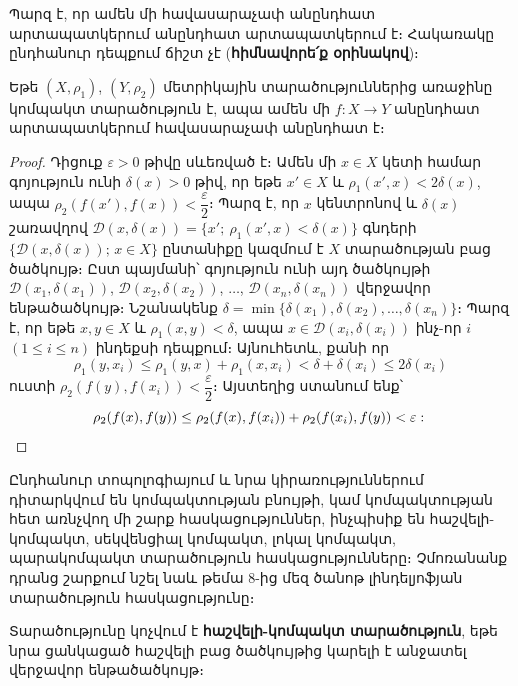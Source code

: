 \documentclass[./main.tex]{subfiles}
\begin{document}
\par Պարզ է, որ ամեն մի հավասարաչափ անընդհատ արտապատկերում անընդհատ արտապատկերում է։ Հակառակը ընդհանուր դեպքում ճիշտ չէ (\textbf{հիմնավորե՛ք օրի\-նա\-կով})։

\begin{theorem}\label{ch17thm10} \label{թեորեմ 10}
Եթե $(X, \rho_1)$, $(Y, \rho_2)$ մետրիկային տարածություններից առաջինը կոմ\-պակտ տարածություն է, ապա ամեն մի $f: X \to Y$ անընդհատ արտապատկե\-րում հավասարաչափ անընդհատ է։
\end{theorem} %

\begin{proof}
Դիցուք $\varepsilon > 0$ թիվը սևեռված է։ Ամեն մի $x \in X$ կետի համար գո\-յու\-թյուն ունի $\delta(x) > 0$ թիվ, որ եթե $x' \in X$ և $\rho_1(x', x) < 2\delta(x)$, ապա $\rho_2(f(x'), f(x)) < \dfrac{\varepsilon}{2}$։ Պարզ է, որ $x$ կենտրոնով և $\delta(x)$ շառավղով $\mathcal{D}(x, \delta(x)) = \{x';\  \rho_1(x', x) < \delta(x)\}$ գնդերի $\{\mathcal{D}(x, \delta(x));\, x \in X\}$ ընտանիքը կազմում է $X$ տարածության բաց ծածկույթ։ Ըստ պայմանի՝ գոյություն ունի այդ ծածկույթի $\mathcal{D}(x_1, \delta(x_1))$, $\mathcal{D}(x_2, \delta(x_2))$, $\dots$, \linebreak $\mathcal{D}(x_n, \delta(x_n))$ վերջավոր ենթածածկույթ։ Նշանակենք $\delta = \min\{\delta(x_1), \delta(x_2), \dots, \delta(x_n)\}$։ Պարզ է, որ եթե $x, y \in X$ և $\rho_1(x, y) < \delta$, ապա $x \in \mathcal{D}(x_i, \delta(x_i))$ ինչ-որ $i$ $(1 \le i \le n)$ ինդեքսի դեպքում։ Այնուհետև, քանի որ
\[
\rho_1(y, x_i) \le \rho_1(y, x) + \rho_1(x, x_i) < \delta + \delta(x_i) \le 2\delta(x_i)
\]
ուստի $\rho_2(f(y), f(x_i)) < \dfrac{\varepsilon}{2}$։ Այստեղից ստանում ենք՝
\[
\rho_2(f(x), f(y)) \le \rho_2(f(x), f(x_i)) + \rho_2(f(x_i), f(y)) < \varepsilon: \qedhere
\]
\end{proof}

\par Ընդհանուր տոպոլոգիայում և նրա կիրառություններում դիտարկվում են կոմ\-պակ\-տության բնույթի, կամ կոմպակտության հետ առնչվող մի շարք հասկացու\-թ\-յուն\-ներ, ինչպիսիք են հաշվելի-կոմպակտ, սեկվենցիալ կոմպակտ, լոկալ կոմպակտ, պարակոմպակտ տարածություն հասկացությունները։ Չմոռանանք դրանց շարքում նշել նաև թեմա 8-ից մեզ ծանոթ լինդելյոֆյան տարածություն հասկացությունը։

\begin{definition}
Տարածությունը կոչվում է \textbf{հաշվելի-կոմպակտ տարածություն}, \linebreak եթե նրա ցանկացած հաշվելի բաց ծածկույթից կարելի է անջատել վերջավոր ենթա\-ծած\-կույթ։
\end{definition}
\end{document}
